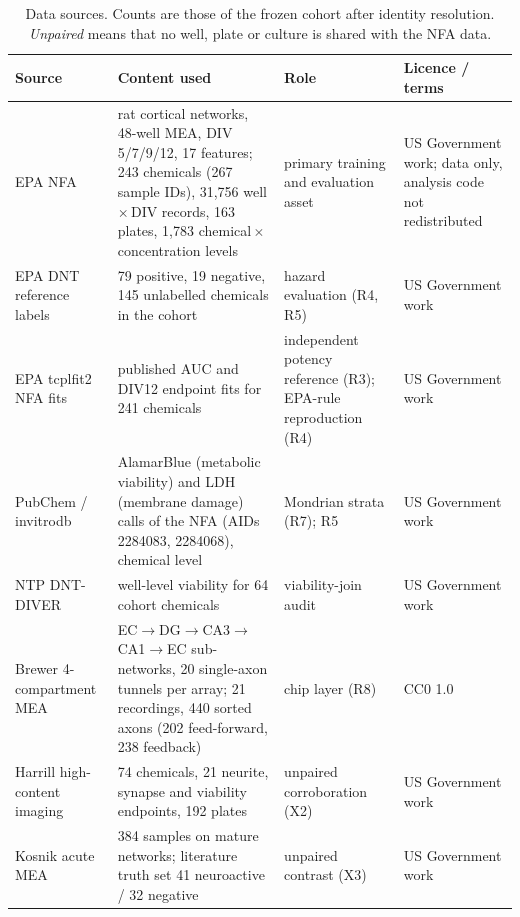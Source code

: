 \documentclass[11pt,a4paper]{article}
\newcommand{\nChem}{243}
\newcommand{\nSpid}{267}
\newcommand{\nRows}{31,756}
\newcommand{\nPlates}{163}
\newcommand{\nLevels}{1,783}
\newcommand{\nPos}{79}
\newcommand{\nNeg}{19}
\newcommand{\nUnl}{145}
\newcommand{\brRec}{21}
\newcommand{\brAx}{440}
\newcommand{\brFF}{202}
\newcommand{\brFB}{238}
\newcommand{\brTun}{20}
\begin{document}
\begin{table}[t]
\centering\small
\caption{Data sources. Counts are those of the frozen cohort after identity resolution. \emph{Unpaired} means
that no well, plate or culture is shared with the NFA data.}\label{tab:data}
\begin{tabularx}{\linewidth}{@{}P{3.2cm}LP{3.0cm}P{2.6cm}@{}}
\toprule
Source & Content used & Role & Licence / terms \\
\midrule
EPA NFA~\cite{carstens2026current,shafer2019evaluation} &
rat cortical networks, 48-well MEA, DIV 5/7/9/12, 17 features; \nChem{} chemicals (\nSpid{} sample IDs),
\nRows{} well\,\(\times\)\,DIV records, \nPlates{} plates, \nLevels{} chemical\,\(\times\)\,concentration levels &
primary training and evaluation asset & US Government work; data only, analysis code not redistributed \\
EPA DNT reference labels~\cite{mundy2015expanding,mundy2024recommended} &
\nPos{} positive, \nNeg{} negative, \nUnl{} unlabelled chemicals in the cohort & hazard evaluation (R4, R5) & US Government work \\
EPA tcplfit2 NFA fits~\cite{sheffield2022tcplfit2,carstens2026current} &
published AUC and DIV12 endpoint fits for 241 chemicals &
independent potency reference (R3); EPA-rule reproduction (R4) & US Government work \\
PubChem / invitrodb~\cite{kim2023pubchem,feshuk2023toxcast} &
AlamarBlue (metabolic viability) and LDH (membrane damage) calls of the NFA (AIDs 2284083, 2284068), chemical level &
Mondrian strata (R7); R5 & US Government work \\
NTP DNT-DIVER~\cite{ntp2018integrative,behl2019screening} &
well-level viability for 64 cohort chemicals & viability-join audit & US Government work \\
Brewer 4-compartment MEA~\cite{lassers2023data,vakilna2021flow,lassers2023flow} &
EC\(\to\)DG\(\to\)CA3\(\to\)CA1\(\to\)EC sub-networks, \brTun{} single-axon tunnels per array; \brRec{} recordings,
\brAx{} sorted axons (\brFF{} feed-forward, \brFB{} feedback) & chip layer (R8) & CC0 1.0 \\
Harrill high-content imaging~\cite{harrill2018testing,harrill2019data} &
74 chemicals, 21 neurite, synapse and viability endpoints, 192 plates &
unpaired corroboration (X2) & US Government work \\
Kosnik acute MEA~\cite{kosnik2020concentration,kosnik2020data} &
384 samples on mature networks; literature truth set 41 neuroactive / 32 negative &
unpaired contrast (X3) & US Government work \\
\bottomrule
\end{tabularx}
\end{table}
\end{document}
